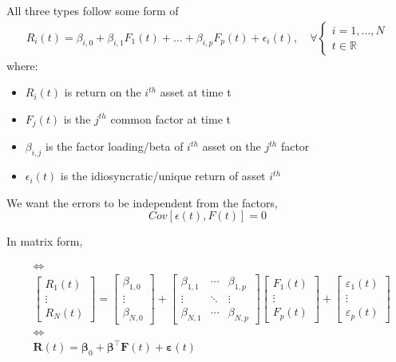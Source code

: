 \documentclass[
  oneside]{book}
\providecommand{\tightlist}{%
  \setlength{\itemsep}{0pt}\setlength{\parskip}{0pt}}
\begin{document}
All three types follow some form of
\[
\begin{aligned}
R_{i}(t) = \beta_{i,0} + \beta_{i,1}F_{1}(t)+\dots+\beta_{i,p}F_{p}(t)+\epsilon_{i}(t), \quad \forall \begin{cases}
i=1,\dots, N \\
t \in \mathbb{R}
\end{cases}
\end{aligned}
\]
where:

\begin{itemize}
\tightlist
\item
  \(R_{i}(t)\) is return on the \(i^{th}\) asset at time t
\item
  \(F_{j}(t)\) is the \(j^{th}\) common factor at time t
\item
  \(\beta_{i,j}\) is the factor loading/beta of \(i^{th}\) asset on the \(j^{th}\) factor
\item
  \(\epsilon_{i}(t)\) is the idiosyncratic/unique return of asset \(i^{th}\)
\end{itemize}

We want the errors to be independent from the factors,
\[
Cov[\epsilon(t), F(t)] = 0
\]

In matrix form,

\[
\begin{aligned}
& \Leftrightarrow \\
& {\left[\begin{array}{c}
R_1(t) \\
\vdots \\
R_N(t)
\end{array}\right] }=\left[\begin{array}{c}
\beta_{1,0} \\
\vdots \\
\beta_{N, 0}
\end{array}\right]+\left[\begin{array}{ccc}
\beta_{1,1} & \cdots & \beta_{1, p} \\
\vdots & \ddots & \vdots \\
\beta_{N, 1} & \cdots & \beta_{N, p}
\end{array}\right]\left[\begin{array}{c}
F_1(t) \\
\vdots \\
F_p(t)
\end{array}\right]+\left[\begin{array}{c}
\varepsilon_1(t) \\
\vdots \\
\varepsilon_p(t)
\end{array}\right] \\
& \Leftrightarrow \\
& \mathbf{R}(t)=\boldsymbol{\beta}_0+\boldsymbol{\beta}^{\top} \mathbf{F}(t)+\boldsymbol{\varepsilon}(t)
\end{aligned}
\]
\end{document}

